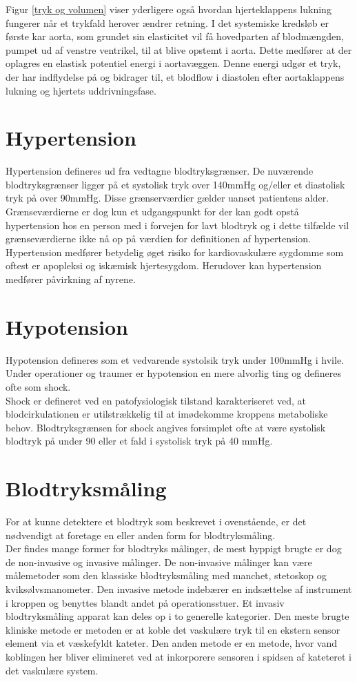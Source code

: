 Figur \ref{tryk og volumen} viser yderligere også hvordan hjerteklappens lukning fungerer når et trykfald herover ændrer retning. I det systemiske kredsløb er første kar aorta, som grundet sin elasticitet vil få hovedparten af blodmængden, pumpet ud af venstre ventrikel, til at blive opstemt i aorta. Dette medfører at der oplagres en elastisk potentiel energi i aortavæggen. Denne energi udgør et tryk, der har indflydelse på og bidrager til, et blodflow i diastolen efter aortaklappens lukning og hjertets uddrivningsfase. 

\section{Hypertension}
Hypertension defineres ud fra vedtagne blodtryksgrænser. De nuværende blodtryksgrænser ligger på et systolisk tryk over 140mmHg og/eller et diastolisk tryk på over 90mmHg. Disse grænserværdier gælder uanset patientens alder. Grænseværdierne er dog kun et udgangspunkt for der kan godt opstå hypertension hos en person med i forvejen for lavt blodtryk og i dette tilfælde vil grænseværdierne ikke nå op på værdien for definitionen af hypertension.\\
Hypertension medfører betydelig øget risiko for kardiovaskulære sygdomme som oftest er apopleksi og iskæmisk hjertesygdom. Herudover kan hypertension medfører påvirkning af nyrene.\cite{Hypertension}

\section{Hypotension}
Hypotension defineres som et vedvarende systolsik tryk under 100mmHg i hvile. \\
Under operationer og traumer er hypotension en mere alvorlig ting og defineres ofte som shock.\\
Shock er defineret ved en patofysiologisk tilstand karakteriseret ved, at blodcirkulationen er utilstrækkelig til at imødekomme kroppens metaboliske behov. Blodtryksgrænsen for shock angives forsimplet ofte at være systolisk blodtryk på under 90 eller et fald i systolisk tryk på 40 mmHg.
\cite{Hypotension}

\section{Blodtryksmåling}
For at kunne detektere et blodtryk som beskrevet i ovenstående, er det nødvendigt at foretage en eller anden form for blodtryksmåling. \\
Der findes mange former for blodtryks målinger, de mest hyppigt brugte er dog de non-invasive og invasive målinger. De non-invasive målinger kan være målemetoder som den klassiske blodtryksmåling med manchet, stetoskop og kviksølvsmanometer. Den invasive metode indebærer en indsættelse af instrument i kroppen og benyttes blandt andet på operationsstuer. Et invasiv blodtryksmåling apparat kan deles op i to generelle kategorier. Den meste brugte kliniske metode er metoden er at koble det vaskulære tryk til en ekstern sensor element via et væskefyldt kateter. Den anden metode er en metode, hvor vand koblingen her bliver elimineret ved at inkorporere sensoren i spidsen af kateteret i det vaskulære system.

